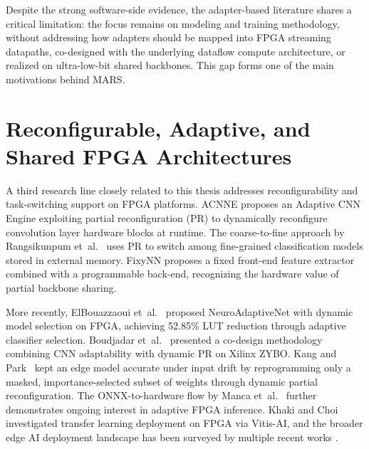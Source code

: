 \documentclass[12pt, a4paper]{report}
\numberwithin{equation}{chapter}
\numberwithin{figure}{chapter}
\numberwithin{table}{chapter}
\numberwithin{algorithm}{chapter}
\begin{document}
Despite the strong software-side evidence, the adapter-based literature shares a critical limitation: the focus remains on modeling and training methodology, without addressing how adapters should be mapped into FPGA streaming datapaths, co-designed with the underlying dataflow compute architecture, or realized on ultra-low-bit shared backbones. This gap forms one of the main motivations behind MARS.

\section{Reconfigurable, Adaptive, and Shared FPGA Architectures}
\label{sec:related_reconfig}

A third research line closely related to this thesis addresses reconfigurability and task-switching support on FPGA platforms. ACNNE \cite{Huang2024ACNNE} proposes an Adaptive CNN Engine exploiting partial reconfiguration (PR) to dynamically reconfigure convolution layer hardware blocks at runtime. The coarse-to-fine approach by Rangsikunpum et~al.~\cite{Rangsikunpum2024CoarseToFine} uses PR to switch among fine-grained classification models stored in external memory. FixyNN \cite{Whatmough2019FixyNN} proposes a fixed front-end feature extractor combined with a programmable back-end, recognizing the hardware value of partial backbone sharing.

More recently, ElBouazzaoui et~al.~\cite{ElBouazzaoui2025NeuroAdaptive} proposed NeuroAdaptiveNet with dynamic model selection on FPGA, achieving 52.85\% LUT reduction through adaptive classifier selection. Boudjadar et~al.~\cite{Boudjadar2025DynamicFPGA} presented a co-design methodology combining CNN adaptability with dynamic PR on Xilinx ZYBO. Kang and Park~\cite{Kang2025RuntimeRobust} kept an edge model accurate under input drift by reprogramming only a masked, importance-selected subset of weights through dynamic partial reconfiguration. The ONNX-to-hardware flow by Manca et~al.~\cite{Manca2024ONNXtoHW} further demonstrates ongoing interest in adaptive FPGA inference. Khaki and Choi~\cite{Khaki2025OptimizingDL} investigated transfer learning deployment on FPGA via Vitis-AI, and the broader edge AI deployment landscape has been surveyed by multiple recent works \cite{Antunes2025SpaceSurvey}.
\end{document}
